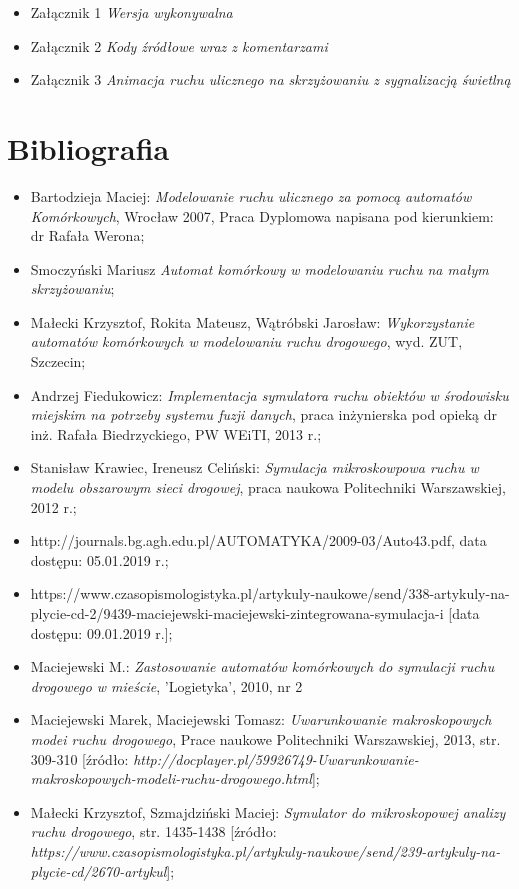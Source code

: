 \documentclass{sprawozdanie-agh}
\begin{document}
	\begin{itemize}
		\item Załącznik 1 \textit{Wersja wykonywalna}
		\item Załącznik 2 \textit{Kody źródłowe wraz z komentarzami}
		\item Załącznik 3 \textit{Animacja ruchu ulicznego na skrzyżowaniu z sygnalizacją świetlną}
	\end{itemize}


	\newpage
	\section{Bibliografia}

	\begin{itemize}
		\item Bartodzieja Maciej: \textit{Modelowanie ruchu ulicznego za pomocą automatów Komórkowych}, Wrocław 2007, Praca Dyplomowa napisana pod kierunkiem: dr Rafała Werona;
		\item Smoczyński Mariusz \textit{Automat komórkowy w modelowaniu ruchu na małym skrzyżowaniu};
		\item Małecki Krzysztof, Rokita Mateusz, Wątróbski Jarosław: \textit{Wykorzystanie automatów komórkowych w modelowaniu ruchu drogowego}, wyd. ZUT, Szczecin;
		\item Andrzej Fiedukowicz: \textit{Implementacja symulatora ruchu obiektów w środowisku miejskim na potrzeby systemu fuzji danych}, praca inżynierska pod opieką dr inż. Rafała Biedrzyckiego, PW WEiTI, 2013 r.;
		\item Stanisław Krawiec, Ireneusz Celiński: \textit{Symulacja mikroskowpowa ruchu w modelu obszarowym sieci drogowej}, praca naukowa Politechniki Warszawskiej, 2012 r.;
		\item http://journals.bg.agh.edu.pl/AUTOMATYKA/2009-03/Auto43.pdf, data dostępu: 05.01.2019 r.;
		\item https://www.czasopismologistyka.pl/artykuly-naukowe/send/338-artykuly-na-plycie-cd-2/9439-maciejewski-maciejewski-zintegrowana-symulacja-i [data dostępu: 09.01.2019 r.];
		\item Maciejewski M.: \textit{Zastosowanie automatów komórkowych do symulacji ruchu drogowego w mieście}, 'Logietyka', 2010, nr 2
		\item Maciejewski Marek, Maciejewski Tomasz: \textit{Uwarunkowanie makroskopowych modei ruchu drogowego}, Prace naukowe Politechniki Warszawskiej, 2013, str. 309-310 [źródło: \textit{http://docplayer.pl/59926749-Uwarunkowanie-makroskopowych-modeli-ruchu-drogowego.html}];
		\item Małecki Krzysztof, Szmajdziński Maciej: \textit{Symulator do mikroskopowej analizy ruchu drogowego}, str. 1435-1438 [źródło: \textit{https://www.czasopismologistyka.pl/artykuly-naukowe/send/239-artykuly-na-plycie-cd/2670-artykul}];
	\end{itemize}
\end{document}
